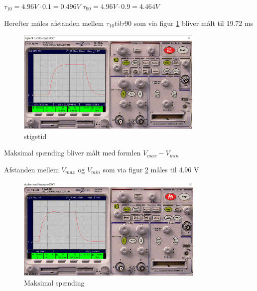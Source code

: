 $\tau_{10} = 4.96 V \cdot 0.1 = 0.496 V$
$\tau_{90} = 4.96 V \cdot 0.9 = 4.464 V$

Herefter måles afstanden mellem $\tau_{10} til \tau{90}$ som via figur \ref{100k.5Hz.stigetid} bliver målt til 19.72 ms

\begin{figure}[h]
 \begin{center}
  \includegraphics[height=5cm]{P_Fig/figur7_100k_5Hz_stigetid}
  \caption{stigetid}
  \label{100k.5Hz.stigetid}
 \end{center}
\end{figure}

Maksimal spænding bliver målt med formlen
$V_{max} - V_{min}$

Afstanden mellem $V_{max}$ og $V_{min}$ som via figur \ref{100k.5Hz.min.max} måles til 4.96 V

\begin{figure}[h]
 \begin{center}
  \includegraphics[height=5cm]{P_Fig/figur5_100k_5Hz_min_max}
  \caption{Maksimal spænding}
  \label{100k.5Hz.min.max}
 \end{center}
\end{figure}
